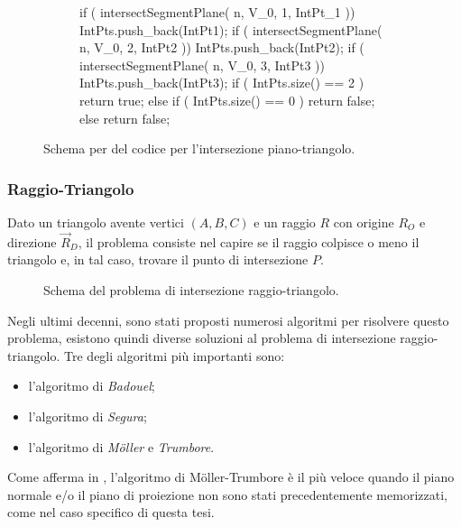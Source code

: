 \begin{figure}[htbp]
	\centering
	\begin{subfigure}{.7\linewidth}
		\begin{pseudoc}
	if ( intersectSegmentPlane( n, V_0, 1, IntPt_1 ))
	{ IntPts.push_back(IntPt1); }
	if ( intersectSegmentPlane( n, V_0, 2, IntPt2 ))
	{ IntPts.push_back(IntPt2); }
	if ( intersectSegmentPlane( n, V_0, 3, IntPt3 ))
	{ IntPts.push_back(IntPt3); }
	if ( IntPts.size() == 2 ) 
	{ return true; }
	else if ( IntPts.size() == 0 ) 
	{ return false; }
	else 
	{ return false; }
		\end{pseudoc}
	\end{subfigure}
	\caption{Schema per del codice per l'intersezione piano-triangolo.}
\end{figure}
%
\subsubsection{Raggio-Triangolo}
Dato un triangolo avente vertici $(A,B,C)$ e un raggio $R$ con origine $R_O$ e direzione $\vec{R}_D$, il problema consiste nel capire se il raggio colpisce o meno il triangolo e, in tal caso, trovare il punto di intersezione $P$.
%
\begin{figure}[htbp]
	\centering
	\caption{Schema del problema di intersezione raggio-triangolo.}
\end{figure}
%
Negli ultimi decenni, sono stati proposti numerosi algoritmi per risolvere questo problema, esistono quindi diverse soluzioni al problema di intersezione raggio-triangolo. Tre degli algoritmi più importanti sono:
\begin{itemize}
	\item l'algoritmo di \textit{Badouel};
	\item l'algoritmo di \textit{Segura};
	\item l'algoritmo di \textit{M\"oller} e \textit{Trumbore}.
\end{itemize}
\noindent
Come \citeauthor{RayTriangle} afferma in \cite{RayTriangle}, l'algoritmo di M\"oller-Trumbore è il più veloce quando il piano normale e/o il piano di proiezione non sono stati precedentemente memorizzati, come nel caso specifico di questa tesi.

